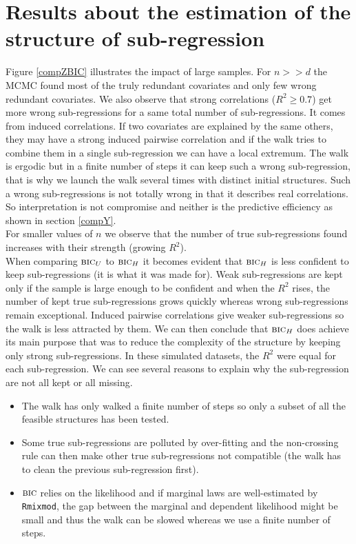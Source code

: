 \documentclass[12pt,a4paper]{report}
\begin{document}
		\section{Results about the estimation of the structure of sub-regression}	\label{compZ}

Figure \ref{compZBIC} illustrates the impact of large samples. For $n>>d$ the MCMC found most of the truly redundant covariates and only few wrong redundant covariates. We also observe that strong correlations ($R^2\geq 0.7$) get more wrong sub-regressions for a same total number of sub-regressions. It comes from induced correlations. If two covariates are explained by the same others, they may have a strong induced pairwise correlation and if the walk tries to combine them in a single sub-regression we can have a local extremum. The walk is ergodic but in a finite number of steps it can keep such a wrong sub-regression, that is why we launch the walk several times with distinct initial structures. Such a wrong sub-regressions is not totally wrong in that it describes real correlations. So interpretation is not compromise and neither is the predictive efficiency as shown in section \ref{compY}. \\
For smaller values of $n$ we observe that the number of true sub-regressions found increases with their strength (growing $R^2$).\\
When comparing $\mbox{{\sc bic}}_U$ to $\mbox{{\sc bic}}_H$ it becomes evident that $\mbox{{\sc bic}}_H$ is less confident to keep sub-regressions (it is what it was made for). Weak sub-regressions are kept only if the sample is large enough to be confident and when the $R^2$ rises, the number of kept true sub-regressions grows quickly whereas wrong sub-regressions remain exceptional. Induced pairwise correlations give weaker sub-regressions so the walk is less attracted by them. We can then conclude that $\mbox{{\sc bic}}_H$ does achieve its main purpose that was to reduce the complexity of the structure by keeping only strong sub-regressions. In these simulated datasets, the $R^2$ were equal for each sub-regression. We can see several reasons to explain why the sub-regression are not all kept or all missing. 
\begin{itemize}
	\item The walk has only walked a finite number of steps so only a subset of all the feasible structures has been tested.
	\item Some true sub-regressions are polluted by over-fitting and the non-crossing rule can then make other true sub-regressions not compatible (the walk has to clean the previous sub-regression first).
	\item $\mbox{{\sc bic}}$ relies on the likelihood and if marginal laws are well-estimated by {\tt Rmixmod}, the gap between the marginal and dependent likelihood might be small and thus the walk can be slowed whereas we use a finite number of steps.
\end{itemize}
\end{document}
